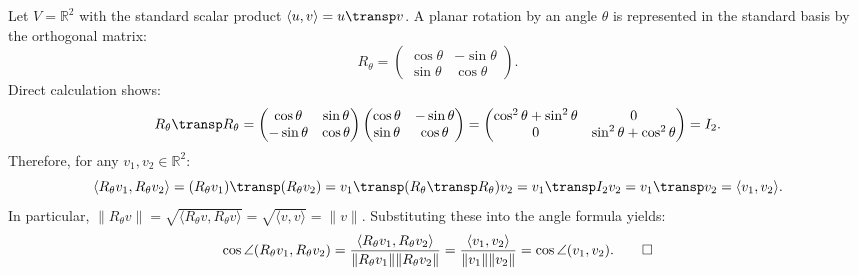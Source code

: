 \begin{exercisesolution}
\label{sol:rotation_invariance_angle}
Let $V = \mathbb{R}^2$ with the standard scalar product $\langle u, v \rangle = u\transp v$.
A planar rotation by an angle $\theta$ is represented in the standard basis by the orthogonal matrix:
\[
R_\theta = \begin{pmatrix} \cos\theta & -\sin\theta \\ \sin\theta & \cos\theta \end{pmatrix}.
\]
Direct calculation shows:
\[
R_\theta\transp R_\theta = \begin{pmatrix} \cos\theta & \sin\theta \\ -\sin\theta & \cos\theta \end{pmatrix} \begin{pmatrix} \cos\theta & -\sin\theta \\ \sin\theta & \cos\theta \end{pmatrix} = \begin{pmatrix} \cos^2\theta + \sin^2\theta & 0 \\ 0 & \sin^2\theta + \cos^2\theta \end{pmatrix} = I_2.
\]
Therefore, for any $v_1, v_2 \in \mathbb{R}^2$:
\[
\langle R_\theta v_1, R_\theta v_2 \rangle = (R_\theta v_1)\transp (R_\theta v_2) = v_1\transp (R_\theta\transp R_\theta) v_2 = v_1\transp I_2 v_2 = v_1\transp v_2 = \langle v_1, v_2 \rangle.
\]
In particular, $\|R_\theta v\| = \sqrt{\langle R_\theta v, R_\theta v \rangle} = \sqrt{\langle v, v \rangle} = \|v\|$.
Substituting these into the angle formula yields:
\[
\cos \angle(R_\theta v_1, R_\theta v_2) = \frac{\langle R_\theta v_1, R_\theta v_2 \rangle}{\|R_\theta v_1\| \|R_\theta v_2\|} = \frac{\langle v_1, v_2 \rangle}{\|v_1\| \|v_2\|} = \cos \angle(v_1, v_2). \qedhere
\]
\end{exercisesolution}

